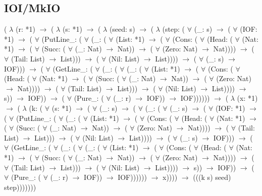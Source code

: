 \subsection*{IOI/MkIO}
{\selectfont
\vspace{0.5cm}
( $\lambda$ (r: *1)
$\rightarrow$ ( $\lambda$ (s: *1)
$\rightarrow$ ( $\lambda$ (seed: s)
$\rightarrow$ ( $\lambda$ (step: ( $\forall$ (_: s)
  $\rightarrow$ ( $\forall$ (IOF: *1)
  $\rightarrow$ ( $\forall$ (PutLine_: ( $\forall$ (_: ( $\forall$ (List: *1)
      $\rightarrow$ ( $\forall$ (Cons: ( $\forall$ (Head: ( $\forall$ (Nat: *1)
          $\rightarrow$ ( $\forall$ (Succ: ( $\forall$ (_: Nat)
            $\rightarrow$ Nat))
          $\rightarrow$ ( $\forall$ (Zero: Nat)
          $\rightarrow$ Nat))))
        $\rightarrow$ ( $\forall$ (Tail: List)
        $\rightarrow$ List)))
      $\rightarrow$ ( $\forall$ (Nil: List)
      $\rightarrow$ List))))
    $\rightarrow$ ( $\forall$ (_: s)
    $\rightarrow$ IOF)))
  $\rightarrow$ ( $\forall$ (GetLine_: ( $\forall$ (_: ( $\forall$ (_: ( $\forall$ (List: *1)
        $\rightarrow$ ( $\forall$ (Cons: ( $\forall$ (Head: ( $\forall$ (Nat: *1)
            $\rightarrow$ ( $\forall$ (Succ: ( $\forall$ (_: Nat)
              $\rightarrow$ Nat))
            $\rightarrow$ ( $\forall$ (Zero: Nat)
            $\rightarrow$ Nat))))
          $\rightarrow$ ( $\forall$ (Tail: List)
          $\rightarrow$ List)))
        $\rightarrow$ ( $\forall$ (Nil: List)
        $\rightarrow$ List))))
      $\rightarrow$ s))
    $\rightarrow$ IOF))
  $\rightarrow$ ( $\forall$ (Pure_: ( $\forall$ (_: r)
    $\rightarrow$ IOF))
  $\rightarrow$ IOF))))))
$\rightarrow$ ( $\lambda$ (x: *1)
$\rightarrow$ ( $\lambda$ (k: ( $\forall$ (s: *1)
  $\rightarrow$ ( $\forall$ (_: s)
  $\rightarrow$ ( $\forall$ (_: ( $\forall$ (_: s)
    $\rightarrow$ ( $\forall$ (IOF: *1)
    $\rightarrow$ ( $\forall$ (PutLine_: ( $\forall$ (_: ( $\forall$ (List: *1)
        $\rightarrow$ ( $\forall$ (Cons: ( $\forall$ (Head: ( $\forall$ (Nat: *1)
            $\rightarrow$ ( $\forall$ (Succ: ( $\forall$ (_: Nat)
              $\rightarrow$ Nat))
            $\rightarrow$ ( $\forall$ (Zero: Nat)
            $\rightarrow$ Nat))))
          $\rightarrow$ ( $\forall$ (Tail: List)
          $\rightarrow$ List)))
        $\rightarrow$ ( $\forall$ (Nil: List)
        $\rightarrow$ List))))
      $\rightarrow$ ( $\forall$ (_: s)
      $\rightarrow$ IOF)))
    $\rightarrow$ ( $\forall$ (GetLine_: ( $\forall$ (_: ( $\forall$ (_: ( $\forall$ (List: *1)
          $\rightarrow$ ( $\forall$ (Cons: ( $\forall$ (Head: ( $\forall$ (Nat: *1)
              $\rightarrow$ ( $\forall$ (Succ: ( $\forall$ (_: Nat)
                $\rightarrow$ Nat))
              $\rightarrow$ ( $\forall$ (Zero: Nat)
              $\rightarrow$ Nat))))
            $\rightarrow$ ( $\forall$ (Tail: List)
            $\rightarrow$ List)))
          $\rightarrow$ ( $\forall$ (Nil: List)
          $\rightarrow$ List))))
        $\rightarrow$ s))
      $\rightarrow$ IOF))
    $\rightarrow$ ( $\forall$ (Pure_: ( $\forall$ (_: r)
      $\rightarrow$ IOF))
    $\rightarrow$ IOF))))))
  $\rightarrow$ x))))
$\rightarrow$ (((k s) seed) step)))))))
}